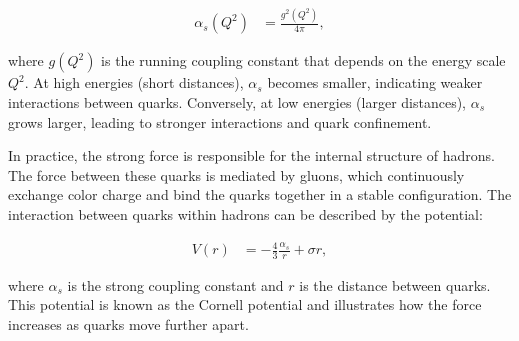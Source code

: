 \begin{align}
  \alpha_s(Q^2) &= \frac{g^2(Q^2)}{4 \pi},
\end{align}

where \( g(Q^2) \) is the running coupling constant that depends on the energy scale \( Q^2 \).
At high energies (short distances), \( \alpha_s \) becomes smaller, indicating weaker interactions between quarks.
Conversely, at low energies (larger distances), \( \alpha_s \) grows larger, leading to stronger interactions and quark confinement.

In practice, the strong force is responsible for the internal structure of hadrons.
The force between these quarks is mediated by gluons, which continuously exchange color charge and bind the quarks together in a stable configuration.
The interaction between quarks within hadrons can be described by the potential:

\begin{align}
  V(r) &= -\frac{4}{3} \frac{\alpha_s}{r}+\sigma r,
\end{align}

where \( \alpha_s \) is the strong coupling constant and \( r \) is the distance between quarks.
This potential is known as the Cornell potential and illustrates how the force increases as quarks move further apart.

